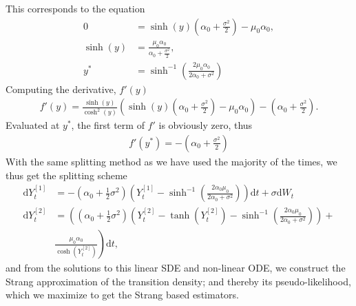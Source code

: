 This corresponds to the equation 
\begin{align}
    0 &= \sinh(y)\left(\alpha_0 + \frac{\sigma^2}{2}\right) - \mu_0 \alpha_0,\nonumber\\
    \sinh(y) &= \frac{\mu_0\alpha_0}{\alpha_0 + \frac{\sigma^2}{2}}, \nonumber\\
    y^* &= \sinh^{-1}\left(\frac{2\mu_0\alpha_0}{2\alpha_0 + \sigma^2}\right)
\end{align}
Computing the derivative, $f'(y)$
\begin{align}
    f'(y) = \frac{\sinh(y)}{\cosh^2(y)}\left(\sinh(y)\left(\alpha_0 + \frac{\sigma^2}{2}\right) - \mu_0\alpha_0\right) - \left(\alpha_0 + \frac{\sigma^2}{2}\right).
\end{align}
Evaluated at $y^*$, the first term of $f'$ is obviously zero, thus
\begin{align}
    f'(y^*) = -\left(\alpha_0 + \frac{\sigma^2}{2}\right)
\end{align}
With the same splitting method as we have used the majority of the times, we thus get the splitting scheme
\begin{align}
    \mathrm{d}Y_t^{[1]} &= -\left(\alpha_0 + \frac{1}{2}\sigma^2\right)\left(Y_t^{[1]} - \sinh^{-1}\left(\frac{2\alpha_0\mu_0}{2\alpha_0 + \sigma^2}\right)\right)\mathrm{d}t + \sigma \mathrm{d}W_t \\
    \mathrm{d}Y_t^{[2]} &= \left(\left(\alpha_0 + \frac{1}{2}\sigma^2\right) \left(Y_t^{[2]} - \tanh\left(Y_t^{[2]}\right) - \sinh^{-1}\left(\frac{2\alpha_0\mu_0}{2\alpha_0 + \sigma^2}\right)\right) + \right. \nonumber \\
    &\left. \frac{\mu_0\alpha_0}{\cosh\left(Y_t^{[2]}\right)}\right)\mathrm{d}t, \label{eq:StrangTDiffusion}
\end{align}
and from the solutions to this linear SDE and non-linear ODE, we construct the Strang approximation of the transition density; and thereby its pseudo-likelihood, which we maximize to get the Strang based estimators.
